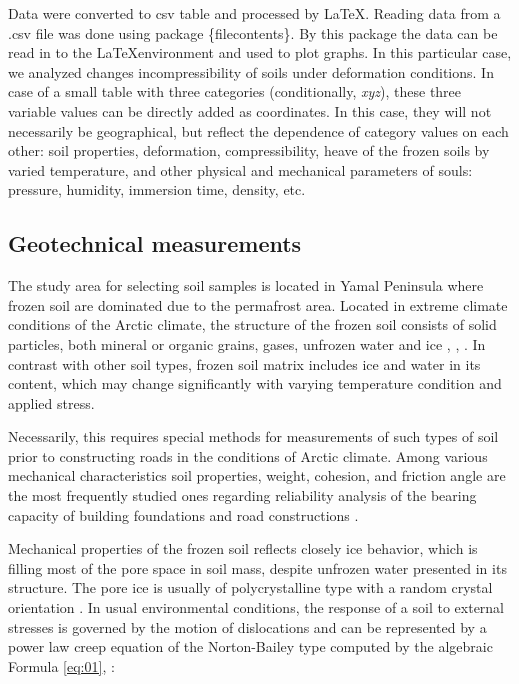 \documentclass[a4paper,10pt]{article}
\begin{document}
Data were converted to csv table and processed by \LaTeX. Reading data from a .csv file was done using package \{filecontents\}. By this package the data can be read in to the \LaTeX \space environment and used to plot graphs. In this particular case, we analyzed changes incompressibility of soils under deformation conditions. In case of a small table with three categories (conditionally, \emph{xyz}), these three variable values can be directly added as coordinates. In this case, they will not necessarily be geographical, but reflect the dependence of category values on each other: soil properties, deformation, compressibility, heave of the frozen soils by varied temperature, and other physical and mechanical parameters of souls: pressure, humidity, immersion time, density, etc.

\subsection{Geotechnical measurements}

The study area for selecting soil samples is located in Yamal Peninsula where frozen soil are dominated due to the permafrost area. Located in extreme climate conditions of the Arctic climate, the structure of the frozen soil consists of solid particles, both mineral or organic grains, gases, unfrozen water and ice \cite{Rathmayer1989}, \cite{Lemenkov2018d}, \cite{AnderstandLananyi}. In contrast with other soil types, frozen soil matrix includes ice and water in its content, which may change significantly with varying temperature condition and applied stress. 

Necessarily, this requires special methods for measurements of such types of soil prior to constructing roads in the conditions of Arctic climate. Among various mechanical characteristics soil properties, weight, cohesion, and friction angle are the most frequently studied ones regarding reliability analysis of the bearing capacity of building foundations and road constructions \cite{Statens2010}. 

Mechanical properties of the frozen soil reflects closely ice behavior, which is filling most of the pore space in soil mass, despite unfrozen water presented in its structure. The pore ice is usually of polycrystalline type with a random crystal orientation \cite{Merriam1976}. In usual environmental conditions, the response of a soil to external stresses is governed by the motion of dislocations and can be represented by a power law creep equation of the Norton-Bailey type computed by the algebraic Formula \ref{eq:01}, \cite{Bratten2008}:
\end{document}
